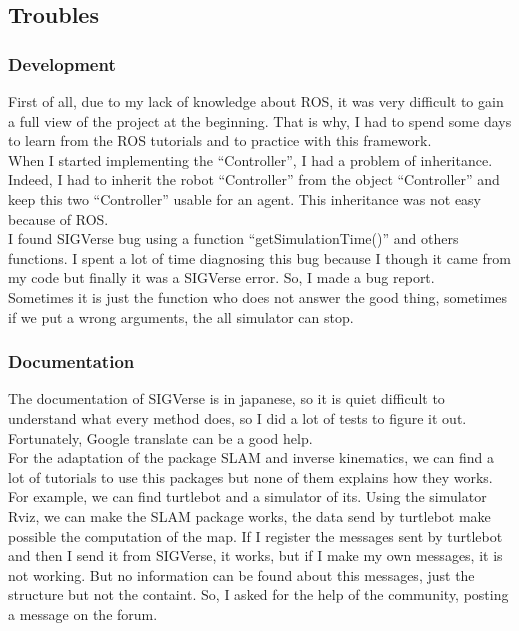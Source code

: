 \subsection{Troubles}
\subsubsection{Development}
First of all, due to my lack of knowledge about ROS, it was very difficult to gain a full view of the project at the beginning. That is why, I had to spend some days to learn from the ROS tutorials and to practice with this framework.\\
When I started implementing the ``Controller'', I had a problem of inheritance. Indeed, I had to inherit the robot ``Controller'' from the object ``Controller'' and keep this two ``Controller'' usable for an agent. This inheritance was not easy because of ROS.\\
I found SIGVerse bug using a function ``getSimulationTime()'' and others functions. I spent a lot of time diagnosing this bug because I though it came from my code but finally it was a SIGVerse error. So, I made a bug report.\\
Sometimes it is just the function who does not answer the good thing, sometimes if we put a wrong arguments, the all simulator can stop.

\subsubsection{Documentation}
The documentation of SIGVerse is in japanese, so it is quiet difficult to understand what every method does, so I did a lot of tests to figure it out. Fortunately, Google translate can be a good help.\\

For the adaptation of the package SLAM and inverse kinematics, we can find a lot of tutorials to use this packages but none of them explains how they works.\\
For example, we can find turtlebot and a simulator of its. Using the simulator Rviz, we can make the SLAM package works, the data send by turtlebot make possible the computation of the map. If I register the messages sent by turtlebot and then I send it from SIGVerse, it works, but if I make my own messages, it is not working. But no information can be found about this messages, just the structure but not the containt. So, I asked for the help of the community, posting a message on the forum.\\

